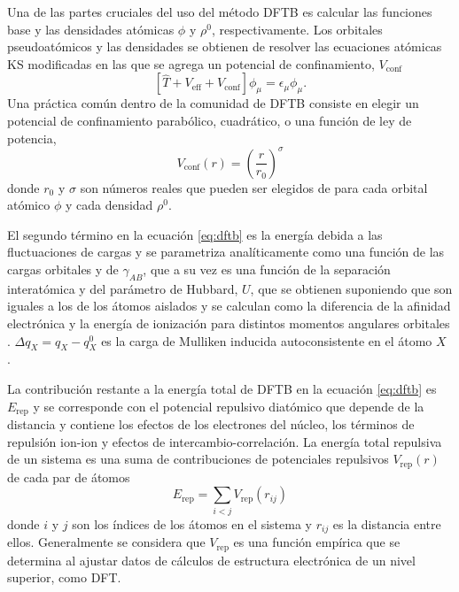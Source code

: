 Una de las partes cruciales del uso del método DFTB es calcular las funciones 
base y las densidades atómicas $\phi$ y $\rho^0$, respectivamente. Los orbitales
pseudoatómicos y las densidades se obtienen de resolver las ecuaciones atómicas KS 
modificadas en las que se agrega un potencial de confinamiento, $V_{\text{conf}}$
\begin{equation}\label{eq:dft}
    \left[\hat{T}+V_{\text{eff}}+V_{\text{conf}}\right]\phi_\mu=\epsilon_\mu\phi_\mu.
\end{equation}
Una práctica común dentro de la comunidad de DFTB consiste en elegir un potencial
de confinamiento parabólico, cuadrático, o una función de ley de potencia,
\begin{equation}\label{eq:vconf}
    V_{\text{conf}}(r)=\left(\frac{r}{r_0}\right)^{\sigma}
\end{equation}
donde $r_0$ y $\sigma$ son números reales que pueden ser elegidos de para cada 
orbital atómico $\phi$ y cada densidad $\rho^0$.

El segundo término en la ecuación \ref{eq:dftb} es la energía debida a las 
fluctuaciones de cargas y se parametriza analíticamente como una función de las
cargas orbitales y de $\gamma_{AB}$, que a su vez es una función de la separación 
interatómica y del parámetro de Hubbard, $U$, que se obtienen suponiendo que son 
iguales a los de los átomos aislados y se calculan como la diferencia de la 
afinidad electrónica y la energía de ionización para distintos momentos angulares 
orbitales \cite{elstner1998b}. $\Delta q_X = q_X - q_X^0$ es la carga de Mulliken 
inducida autoconsistente en el átomo $X$ \cite{elstner1998}.

La contribución restante a la energía total de DFTB en la ecuación \ref{eq:dftb}
es $E_{\text{rep}}$ y se corresponde con el potencial repulsivo diatómico que 
depende de la distancia y contiene los efectos de los electrones del núcleo, los 
términos de repulsión ion-ion y efectos de intercambio-correlación. 
La energía total repulsiva de un sistema es una suma de contribuciones de 
potenciales repulsivos $V_{\text{rep}}(r)$ de cada par de átomos
\begin{equation}\label{eq:rep}
    E_{\text{rep}}=\sum_{i<j} V_{\text{rep}}(r_{ij})
\end{equation}
donde $i$ y $j$ son los índices de los átomos en el sistema y $r_{ij}$ es la 
distancia entre ellos. Generalmente se considera que $V_{\text{rep}}$ es una
función empírica que se determina al ajustar datos de cálculos de estructura 
electrónica de un nivel superior, como DFT.
